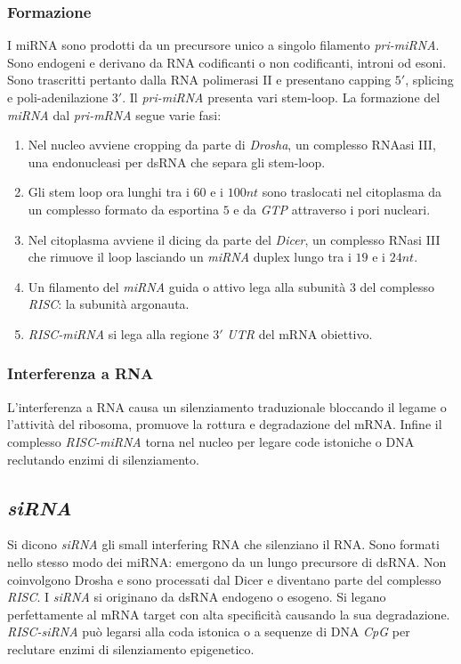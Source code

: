\subsubsection{Formazione}
I miRNA sono prodotti da un precursore unico a singolo filamento \emph{pri-miRNA}. Sono endogeni e derivano da RNA codificanti o non codificanti, introni od esoni. Sono trascritti
pertanto dalla RNA polimerasi II e presentano capping $5'$, splicing e poli-adenilazione $3'$. Il \emph{pri-miRNA} presenta vari stem-loop. La formazione del \emph{miRNA} dal 
\emph{pri-mRNA} segue varie fasi:
\begin{enumerate}
	\item Nel nucleo avviene cropping da parte di \emph{Drosha}, un complesso RNAasi III, una endonucleasi per dsRNA che separa gli stem-loop.
	\item Gli stem loop ora lunghi tra i $60$ e i $100nt$ sono traslocati nel citoplasma da un complesso formato da esportina $5$ e da \emph{GTP} attraverso i pori nucleari.
	\item Nel citoplasma avviene il dicing da parte del \emph{Dicer}, un complesso RNasi III che rimuove il loop lasciando un \emph{miRNA} duplex lungo tra i $19$ e i $24nt$. 
	\item Un filamento del \emph{miRNA} guida o attivo lega alla subunit\`a $3$ del complesso \emph{RISC}: la subunit\`a argonauta.
	\item \emph{RISC-miRNA} si lega alla regione $3'$ \emph{UTR} del mRNA obiettivo.
\end{enumerate}
\subsubsection{Interferenza a RNA}
L'interferenza a RNA causa un silenziamento traduzionale bloccando il legame o l'attivit\`a del ribosoma, promuove la rottura e degradazione del mRNA. Infine il complesso 
\emph{RISC-miRNA} torna nel nucleo per legare code istoniche o DNA reclutando enzimi di silenziamento. 
\subsection{\emph{siRNA}}
Si dicono \emph{siRNA} gli small interfering RNA che silenziano il RNA. Sono formati nello stesso modo dei miRNA: emergono da un lungo precursore di dsRNA. Non coinvolgono Drosha
e sono processati dal Dicer e diventano parte del complesso \emph{RISC}. I \emph{siRNA} si originano da dsRNA endogeno o esogeno. Si legano perfettamente al mRNA target con alta 
specificit\`a causando la sua degradazione. \emph{RISC-siRNA} pu\`o legarsi alla coda istonica o a sequenze di DNA \emph{CpG} per reclutare enzimi di silenziamento epigenetico. 
